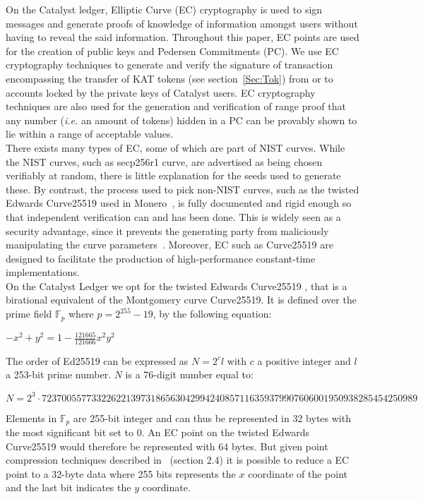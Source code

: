 On the Catalyst ledger, Elliptic Curve (EC) cryptography is used to sign messages and generate proofs of knowledge of information amongst users without having to reveal the said information. Throughout this paper, EC points are used for the creation of public keys and Pedersen Commitments (PC). We use EC cryptography techniques to generate and verify the signature of transaction encompassing the transfer of KAT tokens (see section~\ref{Sec:Tok}) from or to accounts locked by the private keys of Catalyst users. EC cryptography techniques are also used for the generation and verification of range proof that any number (\textit{i.e.} an amount of tokens) hidden in a PC can be provably shown to lie within a range of acceptable values.\\
 
There exists many types of EC, some of which are part of NIST curves. While the NIST curves, such as secp256r1 curve, are advertised as being chosen verifiably at random, there is little explanation for the seeds used to generate these. By contrast, the process used to pick non-NIST curves, such as the twisted Edwards Curve25519 used in Monero~\cite{monero}, is fully documented and rigid enough so that independent verification can and has been done. This is widely seen as a security advantage, since it prevents the generating party from maliciously manipulating the curve parameters~\cite{NSA}. Moreover, EC such as Curve25519 are designed to facilitate the production of high-performance constant-time implementations. \\

On the Catalyst Ledger we opt for the twisted Edwards Curve25519 \cite{ed25519}, that is a birational equivalent of the Montgomery curve Curve25519. It is defined over the prime field $\mathbb{F}_{p}$ where $p = 2^{255} - 19$, by the following equation:
\begin{center}
$-x^2+y^2=1-\frac{121665}{121666}x^2y^2$
\end{center}
The order of Ed25519 can be expressed as $N=2^cl$ with $c$ a positive integer and $l$ a 253-bit prime number. $N$ is a 76-digit number equal to:
\begin{center}
\begin{footnotesize}
$N=2^3\cdot 7237005577332262213973186563042994240857116359379907606001950938285454250989$
\end{footnotesize}
\end{center}

Elements in $\mathbb{F}_{p}$ are 255-bit integer and can thus be represented in 32 bytes with the most significant bit set to 0. An EC point on the twisted Edwards Curve25519 would therefore be represented with 64 bytes. But given point compression techniques described in~\cite{monero} (section 2.4) it is possible to reduce a EC point to a 32-byte data where 255 bits represents the $x$ coordinate of the point and the last bit indicates the $y$ coordinate. \\

